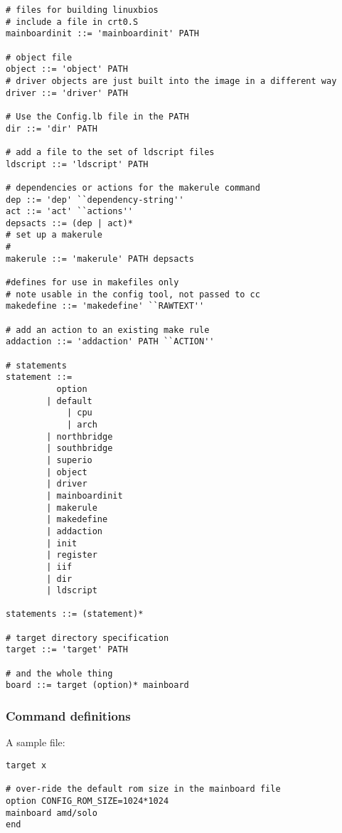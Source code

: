 \begin{verbatim}
# files for building linuxbios
# include a file in crt0.S 
mainboardinit ::= 'mainboardinit' PATH 

# object file 
object ::= 'object' PATH
# driver objects are just built into the image in a different way
driver ::= 'driver' PATH

# Use the Config.lb file in the PATH
dir ::= 'dir' PATH

# add a file to the set of ldscript files
ldscript ::= 'ldscript' PATH

# dependencies or actions for the makerule command
dep ::= 'dep' ``dependency-string''
act ::= 'act' ``actions''
depsacts ::= (dep | act)*
# set up a makerule
#
makerule ::= 'makerule' PATH depsacts

#defines for use in makefiles only
# note usable in the config tool, not passed to cc
makedefine ::= 'makedefine' ``RAWTEXT''

# add an action to an existing make rule
addaction ::= 'addaction' PATH ``ACTION''

# statements
statement ::= 
		  option
		| default
        	| cpu
        	| arch
		| northbridge
		| southbridge
		| superio
		| object
		| driver
		| mainboardinit
		| makerule
		| makedefine
		| addaction
		| init
		| register
		| iif
		| dir
		| ldscript

statements ::= (statement)*

# target directory specification
target ::= 'target' PATH

# and the whole thing
board ::= target (option)* mainboard

\end{verbatim}

\subsubsection{Command definitions}


A sample file:

\begin{verbatim}
target x

# over-ride the default rom size in the mainboard file
option CONFIG_ROM_SIZE=1024*1024
mainboard amd/solo
end

\end{verbatim}

